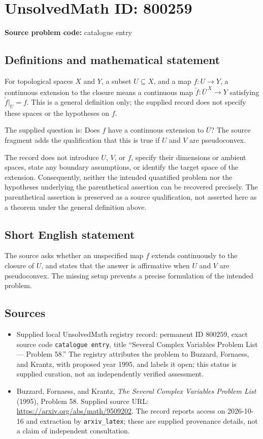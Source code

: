 \documentclass[11pt]{article}
\begin{document}
\section*{UnsolvedMath ID: 800259}
\textbf{Source problem code:} catalogue entry
\subsection{Definitions and mathematical statement}
For topological spaces \(X\) and \(Y\), a subset \(U\subseteq X\), and a map \(f:U\to Y\), a continuous extension to the closure means a continuous map \(\widetilde f:\overline U^{\,X}\to Y\) satisfying \(\widetilde f|_U=f\). This is a general definition only; the supplied record does not specify these spaces or the hypotheses on \(f\).

The supplied question is: Does \(f\) have a continuous extension to \(\overline U\)? The source fragment adds the qualification that this is true if \(U\) and \(V\) are pseudoconvex.

The record does not introduce \(U\), \(V\), or \(f\), specify their dimensions or ambient spaces, state any boundary assumptions, or identify the target space of the extension. Consequently, neither the intended quantified problem nor the hypotheses underlying the parenthetical assertion can be recovered precisely. The parenthetical assertion is preserved as a source qualification, not asserted here as a theorem under the general definition above.
\subsection{Short English statement}
The source asks whether an unspecified map \(f\) extends continuously to the closure of \(U\), and states that the answer is affirmative when \(U\) and \(V\) are pseudoconvex. The missing setup prevents a precise formulation of the intended problem.
\subsection{Sources}
\begin{itemize}
\item Supplied local UnsolvedMath registry record: permanent ID \(800259\), exact source code \texttt{catalogue entry}, title ``Several Complex Variables Problem List --- Problem 58.'' The registry attributes the problem to Buzzard, Fornaess, and Krantz, with proposed year 1995, and labels it open; this status is supplied curation, not an independently verified assessment.
\item Buzzard, Fornaess, and Krantz, \emph{The Several Complex Variables Problem List} (1995), Problem 58. Supplied source URL: \url{https://arxiv.org/abs/math/9509202}. The record reports access on 2026-10-16 and extraction by \texttt{arxiv\_latex}; these are supplied provenance details, not a claim of independent consultation.
\end{itemize}
\end{document}
